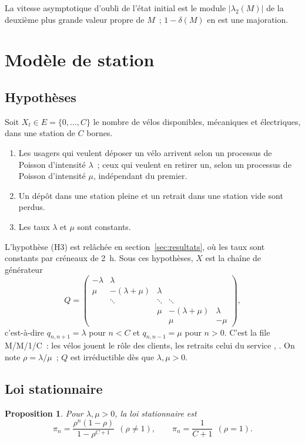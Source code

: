 \documentclass[10pt,a4paper,twocolumn]{article}
\theoremstyle{enonce}
\newtheorem{proposition}[theoreme]{Proposition}
\theoremstyle{defi}
\begin{document}
La vitesse asymptotique d'oubli de l'état initial est le module $|\lambda_2(M)|$ de la deuxième plus grande valeur propre de $M$~; $1-\delta(M)$ en est une majoration.

\section{Modèle de station}\label{sec:modele}

\subsection{Hypothèses}

Soit $X_t\in E=\{0,\dots,C\}$ le nombre de vélos disponibles, mécaniques et électriques, dans une station de $C$ bornes.
\begin{enumerate}[label=(H\arabic*)]
\item Les usagers qui veulent déposer un vélo arrivent selon un processus de Poisson d'intensité $\lambda$~; ceux qui veulent en retirer un, selon un processus de Poisson d'intensité $\mu$, indépendant du premier.
\item Un dépôt dans une station pleine et un retrait dans une station vide sont perdus.
\item Les taux $\lambda$ et $\mu$ sont constants.
\end{enumerate}
L'hypothèse (H3) est relâchée en section~\ref{sec:resultats}, où les taux sont constants par créneaux de 2~h. Sous ces hypothèses, $X$ est la chaîne de générateur
\[
Q=\begin{pmatrix}
-\lambda & \lambda & & & \\
\mu & -(\lambda+\mu) & \lambda & & \\
 & \ddots & \ddots & \ddots & \\
 & & \mu & -(\lambda+\mu) & \lambda\\
 & & & \mu & -\mu
\end{pmatrix},
\]
c'est-à-dire $q_{n,n+1}=\lambda$ pour $n<C$ et $q_{n,n-1}=\mu$ pour $n>0$. C'est la file M/M/1/C~: les vélos jouent le rôle des clients, les retraits celui du service \cite[§3.5]{STGH18}, \cite{Bre99}. On note $\rho=\lambda/\mu$~; $Q$ est irréductible dès que $\lambda,\mu>0$.

\subsection{Loi stationnaire}

\begin{proposition}\label{prop:pi}
Pour $\lambda,\mu>0$, la loi stationnaire est
\[
\pi_n=\frac{\rho^n(1-\rho)}{1-\rho^{C+1}}\ \ (\rho\neq1),\qquad\pi_n=\frac{1}{C+1}\ \ (\rho=1).
\]
\end{proposition}
\end{document}
